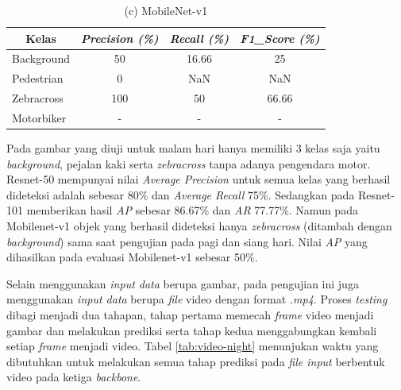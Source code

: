 \begin{table}[!h]
\begin{minipage}[b]{\textwidth}
	\end{minipage}
	\vfill
	\begin{minipage}[b]{\textwidth}
		\centering
		\caption*{(c) MobileNet-v1}
		\begin{tabular}{|l|c|c|c|}
			\hline
			\multicolumn{1}{|c|}{\textbf{Kelas}} & \textit{\textbf{Precision (\%)}} & \textit{\textbf{Recall (\%)}} & \textit{\textbf{F1\_Score (\%)}} \\ \hline
			Background                           & 50                               & 16.66                         & 25                               \\ \hline
			Pedestrian                           & 0                                & NaN                           & NaN                              \\ \hline
			Zebracross                           & 100                              & 50                            & 66.66                            \\ \hline
			Motorbiker                           & -                                & -                             & -                                \\ \hline
		\end{tabular}
		
	\end{minipage}
	
	\label{tab:evaluate-night}
\end{table}

Pada gambar yang diuji untuk malam hari hanya memiliki 3 kelas saja yaitu \textit{background}, pejalan kaki serta \textit{zebracross} tanpa adanya pengendara motor. Resnet-50 mempunyai nilai \textit{Average Precision} untuk semua kelas yang berhasil dideteksi adalah sebesar 80\% dan \textit{Average Recall} 75\%. Sedangkan pada Resnet-101 memberikan hasil \textit{AP} sebesar 86.67\% dan \textit{AR} 77.77\%. Namun pada Mobilenet-v1 objek yang berhasil dideteksi hanya \textit{zebracross} (ditambah dengan \textit{background}) sama saat pengujian pada pagi dan siang hari. Nilai \textit{AP} yang dihasilkan pada evaluasi Mobilenet-v1 sebesar 50\%.

Selain menggunakan \textit{input data} berupa gambar, pada pengujian ini juga menggunakan \textit{input data} berupa \textit{file} video dengan format \textit{.mp4}. Proses \textit{testing} dibagi menjadi dua tahapan, tahap pertama memecah \textit{frame} video menjadi gambar dan melakukan prediksi serta tahap kedua menggabungkan kembali setiap \textit{frame} menjadi video. Tabel \ref{tab:video-night} menunjukan waktu yang dibutuhkan untuk melakukan semua tahap prediksi pada \textit{file input} berbentuk video pada ketiga \textit{backbone}.

